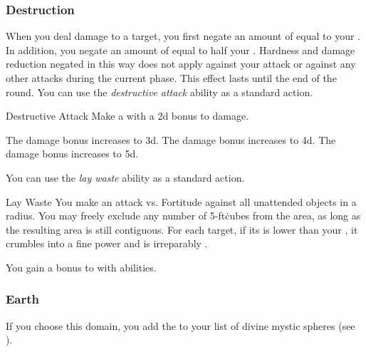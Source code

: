         \subsubsection{Destruction}
             When you deal damage to a target, you first negate an amount of  equal to your .
            In addition, you negate an amount of  equal to half your .
            Hardness and damage reduction negated in this way does not apply against your attack or against any other attacks during the current phase.
            This effect lasts until the end of the round.
             You can use the \textit{destructive attack} ability as a standard action.
            \begin{apability}{Destructive Attack}
                Make a  with a \plus2d bonus to damage.

                \rankline
                 The damage bonus increases to \plus3d.
                 The damage bonus increases to \plus4d.
                 The damage bonus increases to \plus5d.
            \end{apability}
             You can use the \textit{lay waste} ability as a standard action.
            \begin{apability}{Lay Waste}
                You make an attack vs. Fortitude against all unattended objects in a \arealarge radius.
                You may freely exclude any number of 5-ft\. cubes from the area, as long as the resulting area is still contiguous.
                \hit For each target, if its  is lower than your , it crumbles into a fine power and is irreparably .
            \end{apability}
             You gain a  bonus to  with  abilities.

        \subsubsection{Earth}
            If you choose this domain, you add the   to your list of divine mystic spheres (see ).

